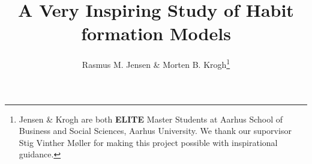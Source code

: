 





\onehalfspacing      %
\renewcommand{\footnote}{\endnote}  %

\author{Rasmus M. Jensen \& Morten B. Krogh\thanks{\rm Jensen \& Krogh are both \textbf{ELITE} Master Students at Aarhus School of Business and Social Sciences, Aarhus University. We thank our suporvisor Stig Vinther Møller for making this project possible with inspirational guidance.}}

\title{\Large \bf A Very Inspiring Study of Habit formation Models}

\date{}              %


\maketitle
\thispagestyle{empty}



\clearpage







\clearpage

\appendix



\clearpage


%
% 



\begin{doublespacing}   %


\end{doublespacing}



\clearpage

\renewcommand{\enotesize}{\normalsize}



